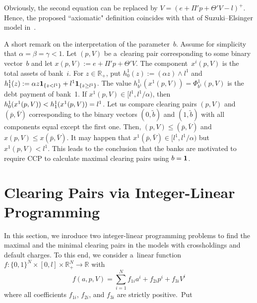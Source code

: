 \begin{multicols}{2}
\vspace*{-4pt}

\noindent
Obviously, the second equation can be replaced by $V = (e + \Pi' p + \Theta' V - l)^+$. 
Hence, the proposed ``axiomatic" definition coincides with that of Suzuki--Elsinger model in~\cite{elsinger2009financial}.


\vspace*{2pt}

A short remark on the interpretation of the parameter~$b$.  
Assume for simplicity that $\alpha = \beta = \gamma < 1$.    
Let   $(p, V)$ be a~clearing pair corresponding to some binary vector~$b$ 
and let  $x(p,V) := e + \Pi' p + \Theta'V$. The component~$x^i(p,V)$ is the total  assets of bank~$i$. 
For $z \in \mathbb{R}_+$, put $h^1_0(z) := (\alpha z) \wedge l^1$ and $h^1_1 (z) := \alpha z {\bf 1}_{ \{ z < l^1 \} } + l^1 {\bf 1}_{ \{ z \geq l^1 \} }$.
The value $h^1_{b^1}(x^1(p, V)) = \Phi^1_{b^1}(p, V)$  is the debt payment of bank~1.  
If $x^1(p, V) \in [l^1, l^1/\alpha)$, then  $h^1_0(x^1(p, V))\linebreak < h^1_1(x^1(p, V)) = l^1$. 
Let us compare clearing pairs $(p,V)$ and $(\bar p,\bar V)$ corresponding to the binary vectors $(0,\tilde b)$ and $(1,\tilde b)$ 
with all components equal except the first one. Then, $(p,V)\le (\bar p,\bar V)$ and 
$x(p,V)\le x(\bar p,\bar V)$.  It may happen that 
$ x^1(\bar p, \bar V) \in [l^1, l^1/\alpha)$ but $x^1( p, V) <l^1$.  
This leads to the conclusion that the banks are motivated to require  CCP to calculate maximal  clearing pairs using $b={\bf 1}$. 


\vspace*{-4pt}

\section{Clearing Pairs via Integer-Linear Programming }

\vspace*{-4pt}

\noindent
In this section, we inroduce two integer-linear programming problems to find 
the maximal and  the minimal clearing pairs in the models with crossholdings and default charges. 
To this end, we consider a~linear function $f: \{ 0, 1 \}^N \times [0, l] \times 
\mathbb{R}^N_+ \to \mathbb{R}$ with 
$$
f(a, p, V) = \sum\limits_{i=1}^N f_{1i} a^i + f_{2i} p^i + f_{3i} V^i
$$
where all coefficients  $ f_{1i}$,  $f_{2i}$, and $f_{3i}$ are strictly positive.~Put 


\end{multicols}
